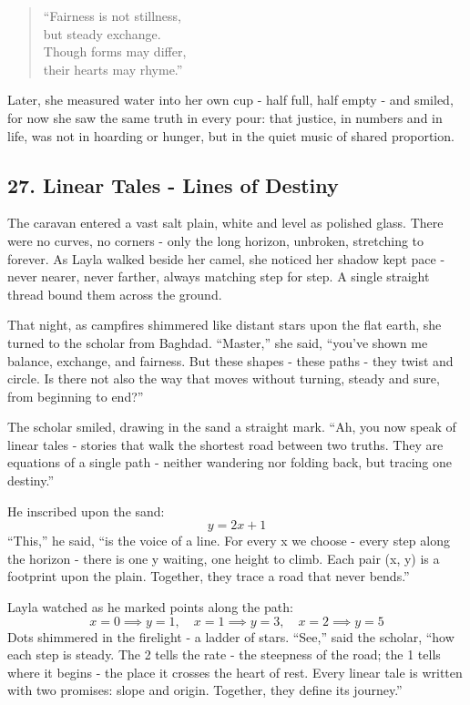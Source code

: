\documentclass[
  letterpaper,
  DIV=11,
  numbers=noendperiod]{scrreprt}
\begin{document}
\begin{quote}
``Fairness is not stillness,\\
but steady exchange.\\
Though forms may differ,\\
their hearts may rhyme.''
\end{quote}

Later, she measured water into her own cup - half full, half empty - and
smiled, for now she saw the same truth in every pour: that justice, in
numbers and in life, was not in hoarding or hunger, but in the quiet
music of shared proportion.

\subsection{27. Linear Tales - Lines of
Destiny}\label{linear-tales---lines-of-destiny}

The caravan entered a vast salt plain, white and level as polished
glass. There were no curves, no corners - only the long horizon,
unbroken, stretching to forever. As Layla walked beside her camel, she
noticed her shadow kept pace - never nearer, never farther, always
matching step for step. A single straight thread bound them across the
ground.

That night, as campfires shimmered like distant stars upon the flat
earth, she turned to the scholar from Baghdad. ``Master,'' she said,
``you've shown me balance, exchange, and fairness. But these shapes -
these paths - they twist and circle. Is there not also the way that
moves without turning, steady and sure, from beginning to end?''

The scholar smiled, drawing in the sand a straight mark. ``Ah, you now
speak of linear tales - stories that walk the shortest road between two
truths. They are equations of a single path - neither wandering nor
folding back, but tracing one destiny.''

He inscribed upon the sand: \[
y = 2x + 1
\] ``This,'' he said, ``is the voice of a line. For every x we choose -
every step along the horizon - there is one y waiting, one height to
climb. Each pair (x, y) is a footprint upon the plain. Together, they
trace a road that never bends.''

Layla watched as he marked points along the path: \[
x = 0 \implies y = 1, \quad x = 1 \implies y = 3, \quad x = 2 \implies y = 5
\] Dots shimmered in the firelight - a ladder of stars. ``See,'' said
the scholar, ``how each step is steady. The 2 tells the rate - the
steepness of the road; the 1 tells where it begins - the place it
crosses the heart of rest. Every linear tale is written with two
promises: slope and origin. Together, they define its journey.''
\end{document}
